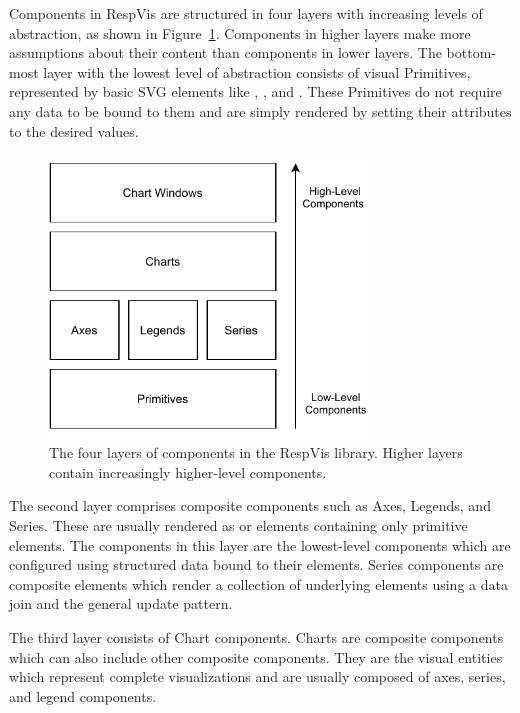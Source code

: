 Components in RespVis are structured in four layers with increasing
levels of abstraction, as shown in Figure~\ref{fig:Layers}. Components
in higher layers make more assumptions about their content than
components in lower layers. The bottom-most layer with the lowest
level of abstraction consists of visual Primitives, represented by
basic SVG elements like , , and
. These Primitives do not require any data to be bound to
them and are simply rendered by setting their attributes to the
desired values.


\begin{figure}[tp]
\centering
\includegraphics[keepaspectratio,width=\linewidth,height=7.5cm]
{diagrams/respvis-layers.pdf}
\caption[Component Layers of RespVis]{
The four layers of components in the RespVis library. Higher layers
contain increasingly higher-level components.
}
\label{fig:Layers}
\end{figure}


The second layer comprises composite components such as Axes, Legends,
and Series. These are usually rendered as  or 
elements containing only primitive elements. The components in this
layer are the lowest-level components which are configured using
structured data bound to their elements. Series components are
composite elements which render a collection of underlying elements
using a data join and the general update pattern.

The third layer consists of Chart components. Charts are composite
components which can also include other composite components. They are
the visual entities which represent complete visualizations and are
usually composed of axes, series, and legend components.

